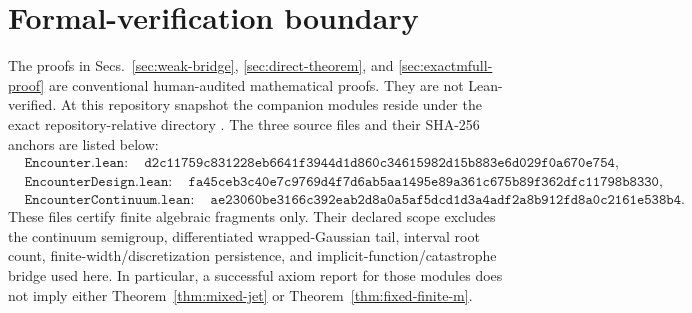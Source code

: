 \documentclass[aps,physrev,onecolumn,amsmath,amssymb,longbibliography]{revtex4-2}
\begin{document}
\section{Formal-verification boundary}
\label{sec:formal-boundary}

The proofs in Secs.~\ref{sec:weak-bridge}, \ref{sec:direct-theorem}, and
\ref{sec:exactmfull-proof} are conventional human-audited mathematical
proofs.  They are not Lean-verified.
At this repository snapshot the companion modules reside under the exact
repository-relative directory
.
The three source files and their SHA-256 anchors are listed below:
\begin{align*}
 &\texttt{Encounter.lean}:\quad
 \texttt{d2c11759c831228eb6641f3944d1d860c34615982d15b883e6d029f0a670e754},\\
 &\texttt{EncounterDesign.lean}:\quad
 \texttt{fa45ceb3c40e7c9769d4f7d6ab5aa1495e89a361c675b89f362dfc11798b8330},\\
 &\texttt{EncounterContinuum.lean}:\quad
 \texttt{ae23060be3166c392eab2d8a0a5af5dcd1d3a4adf2a8b912fd8a0c2161e538b4}.
\end{align*}
These files certify finite algebraic fragments only.  Their declared scope excludes the
continuum semigroup, differentiated wrapped-Gaussian tail, interval root count,
finite-width/discretization persistence, and implicit-function/catastrophe
bridge used here.  In particular, a successful axiom report for those modules
does not imply either Theorem~\ref{thm:mixed-jet} or
Theorem~\ref{thm:fixed-finite-m}.
\end{document}
